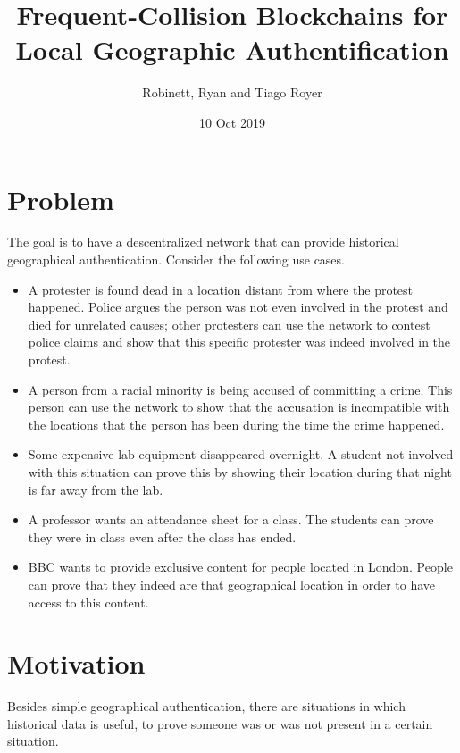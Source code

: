 \documentclass{article}
\title{Frequent-Collision Blockchains for Local Geographic Authentification}
\author{Robinett, Ryan and Tiago Royer}
\date{10 Oct 2019}
\begin{document}
\maketitle

\section*{Problem}

The goal is to have a descentralized network
that can provide historical geographical authentication.
Consider the following use cases.

\begin{itemize}
	\item A protester is found dead in a location distant from where the protest happened.
		Police argues the person was not even involved in the protest
		and died for unrelated causes;
		other protesters can use the network to contest police claims
		and show that this specific protester was indeed involved in the protest.

	\item A person from a racial minority is being accused of committing a crime.
		This person can use the network to show that the accusation
		is incompatible with the locations that the person has been
		during the time the crime happened.

	\item Some expensive lab equipment disappeared overnight.
		A student not involved with this situation
		can prove this by showing their location during that night
		is far away from the lab.

	\item A professor wants an attendance sheet for a class.
		The students can prove they were in class
		even after the class has ended.

	\item BBC wants to provide exclusive content for people located in London.
		People can prove that they indeed are that geographical location
		in order to have access to this content.
\end{itemize}


\section*{Motivation}

Besides simple geographical authentication,
there are situations in which historical data is useful,
to prove someone was or was not present in a certain situation.
\end{document}
